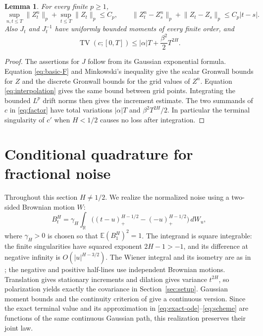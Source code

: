 \documentclass[11pt]{article}
\newtheorem{lemma}[theorem]{Lemma}
\theoremstyle{remark}
\newcommand{\E}{\mathbb E}
\newcommand{\R}{\mathbb R}
\newcommand{\norm}[1]{\lVert#1\rVert}
\newcommand{\abs}[1]{\lvert#1\rvert}
\DeclareMathOperator{\TV}{TV}
\begin{document}
\begin{lemma}\label{lem:moments}
For every finite \(p\ge1\),
\begin{equation}\label{eq:moments}
 \sup_{n,t\le T}\norm{Z^n_t}_p+\sup_{t\le T}\norm{Z_t}_p\le C_p,
 \qquad
 \norm{Z^n_t-Z^n_s}_p+\norm{Z_t-Z_s}_p\le C_p\abs{t-s}.
\end{equation}
Also \(J_t\) and \(J_t^{-1}\) have uniformly bounded moments of every
finite order, and
\begin{equation}\label{eq:c-var}
 \TV(c;[0,T])\le\abs\alpha T+\frac{\beta^2}{2}T^{2H}.
\end{equation}
\end{lemma}
\begin{proof}
The assertions for \(J\) follow from its Gaussian exponential formula.
Equation \eqref{eq:basic-F} and Minkowski's inequality give the scalar
Gronwall bounds for \(Z\) and the discrete Gronwall bounds for the
grid values of \(Z^n\). Equation \eqref{eq:interpolation} gives the same
bound between grid points. Integrating the bounded \(L^p\) drift norms
then gives the increment estimate. The two summands of \(c\) in
\eqref{eq:factor} have total variations \(\abs\alpha T\) and
\(\beta^2T^{2H}/2\). In particular the terminal singularity of \(c'\)
when \(H<1/2\) causes no loss after integration.
\end{proof}

\section{Conditional quadrature for fractional noise}\label{sec:fractional}

Throughout this section \(H\ne1/2\). We realize the normalized noise using
a two-sided Brownian motion \(W\):
\begin{equation}\label{eq:MVN}
 B^H_t=\gamma_H\int_{\R}
       \bigl((t-u)_+^{H-1/2}-(-u)_+^{H-1/2}\bigr)\,dW_u ,
\end{equation}
where \(\gamma_H>0\) is chosen so that \(\E(B^H_1)^2=1\).
The integrand is square integrable: the finite singularities have squared
exponent \(2H-1>-1\), and its difference at negative infinity is
\(O(\abs u^{H-3/2})\). The Wiener integral and its isometry are as in
\cite[Theorem 3.7.1]{Chafai}; the negative and positive half-lines use
independent Brownian motions. Translation gives stationary increments and
dilation gives variance \(t^{2H}\), so polarization yields exactly the
covariance in Section~\ref{sec:setup}. Gaussian moment bounds and the
continuity criterion of \cite[Theorem 3.6.3]{Chafai} give a continuous
version. Since the exact terminal value and its approximation
in \eqref{eq:exact-ode}--\eqref{eq:scheme} are functions of the same
continuous Gaussian path, this realization preserves their joint law.
\end{document}
